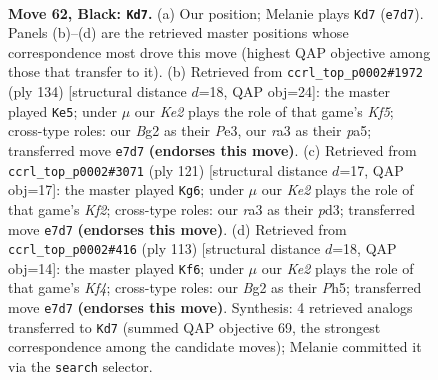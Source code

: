 \documentclass[11pt]{article}
\begin{document}
\clearpage

\begin{figure}[p]\centering
\begin{subfigure}{0.46\textwidth}\centering
\resizebox{\linewidth}{!}{%
\newchessgame
\chessboard[
  setfen={8/4k3/1R4p1/8/1P6/R7/1r4b1/6K1 b - - 3 62},
  showmover=false,
  pgfstyle=straightmove, color=movearrow, markmove={e7-d7}
]}
\caption{}
\end{subfigure}\hfill
\begin{subfigure}{0.46\textwidth}\centering
\resizebox{\linewidth}{!}{%
\newchessgame
\chessboard[
  setfen={8/4k3/8/p4K2/P1r5/2p1P3/8/2R5 w - - 2 68},
  showmover=false,
  pgfstyle=straightmove, color=movearrow, markmove={f5-e5}
]}
\caption{}
\end{subfigure}
\\[4pt]
\begin{subfigure}{0.46\textwidth}\centering
\resizebox{\linewidth}{!}{%
\newchessgame
\chessboard[
  setfen={1r6/5k2/8/1P5R/7p/1K1P4/8/8 b - - 2 61},
  showmover=false,
  pgfstyle=straightmove, color=movearrow, markmove={f7-g6}
]}
\caption{}
\end{subfigure}\hfill
\begin{subfigure}{0.46\textwidth}\centering
\resizebox{\linewidth}{!}{%
\newchessgame
\chessboard[
  setfen={2r5/2P5/8/2R2k1p/7K/8/8/8 b - - 1 57},
  showmover=false,
  pgfstyle=straightmove, color=movearrow, markmove={f5-f6}
]}
\caption{}
\end{subfigure}
\caption{\textbf{Move 62, Black: \texttt{Kd7}.} (a) Our position; Melanie plays \texttt{Kd7} (\texttt{e7d7}). Panels (b)--(d) are the retrieved master positions whose correspondence most drove this move (highest QAP objective among those that transfer to it). (b) Retrieved from \texttt{ccrl\_top\_p0002\#1972} (ply 134) [structural distance $d$=18, QAP obj=24]: the master played \texttt{Ke5}; under $\mu$ our \emph{Ke2} plays the role of that game's \emph{Kf5}; cross-type roles: our \emph{B}g2 as their \emph{P}e3, our \emph{r}a3 as their \emph{p}a5; transferred move \texttt{e7d7} \textbf{(endorses this move)}. (c) Retrieved from \texttt{ccrl\_top\_p0002\#3071} (ply 121) [structural distance $d$=17, QAP obj=17]: the master played \texttt{Kg6}; under $\mu$ our \emph{Ke2} plays the role of that game's \emph{Kf2}; cross-type roles: our \emph{r}a3 as their \emph{p}d3; transferred move \texttt{e7d7} \textbf{(endorses this move)}. (d) Retrieved from \texttt{ccrl\_top\_p0002\#416} (ply 113) [structural distance $d$=18, QAP obj=14]: the master played \texttt{Kf6}; under $\mu$ our \emph{Ke2} plays the role of that game's \emph{Kf4}; cross-type roles: our \emph{B}g2 as their \emph{P}h5; transferred move \texttt{e7d7} \textbf{(endorses this move)}. Synthesis: 4 retrieved analogs transferred to \texttt{Kd7} (summed QAP objective 69, the strongest correspondence among the candidate moves); Melanie committed it via the \texttt{search} selector.}
\label{fig:thought-m123}
\end{figure}
\end{document}
